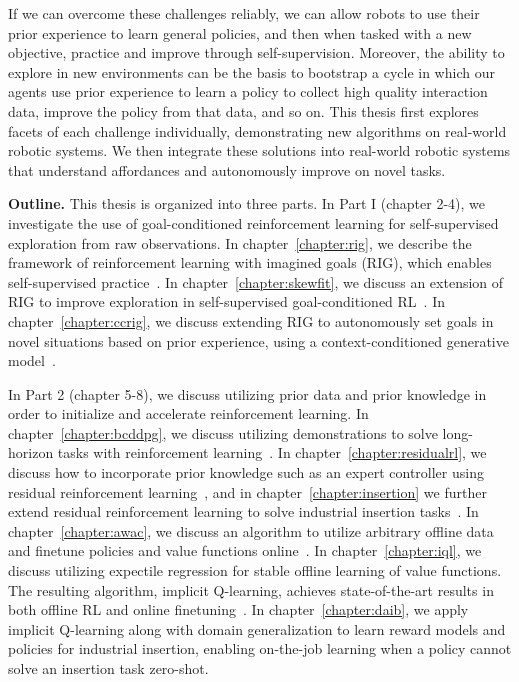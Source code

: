 If we can overcome these challenges reliably, we can allow robots to use their prior experience to learn general policies, and then when tasked with a new objective, practice and improve through self-supervision.
Moreover, the ability to explore in new environments can be the basis to bootstrap a cycle in which our agents use prior experience to learn a policy to collect high quality interaction data, improve the policy from that data, and so on.
This thesis first explores facets of each challenge individually, demonstrating new algorithms on real-world robotic systems.
We then integrate these solutions into real-world robotic systems that understand affordances and autonomously improve on novel tasks.

\vspace{5mm}

\textbf{Outline.} This thesis is organized into three parts. In Part I (chapter 2-4), we investigate the use of goal-conditioned reinforcement learning for self-supervised exploration from raw observations. In chapter~\ref{chapter:rig}, we describe the framework of reinforcement learning with imagined goals (RIG), which enables self-supervised practice~\citep{nair2018rig}. In chapter~\ref{chapter:skewfit}, we discuss an extension of RIG to improve exploration in self-supervised goal-conditioned RL~\citep{pong2019skewfit}. In chapter~\ref{chapter:ccrig}, we discuss extending RIG to autonomously set goals in novel situations based on prior experience, using a context-conditioned generative model~\citep{nair2019ccrig}.

In Part 2 (chapter 5-8), we discuss utilizing prior data and prior knowledge in order to initialize and accelerate reinforcement learning. In chapter~\ref{chapter:bcddpg}, we discuss utilizing demonstrations to solve long-horizon tasks with reinforcement learning~\citep{nair2018demonstrations}. In chapter~\ref{chapter:residualrl}, we discuss how to incorporate prior knowledge such as an expert controller using residual reinforcement learning~\citep{johannink18residualrl}, and in chapter~\ref{chapter:insertion} we further extend residual reinforcement learning to solve industrial insertion tasks~\citep{schoettler2019insertion}. In chapter~\ref{chapter:awac}, we discuss an algorithm to utilize arbitrary offline data and finetune policies and value functions online~\citep{nair2020awac}. In chapter~\ref{chapter:iql}, we discuss utilizing expectile regression for stable offline learning of value functions. The resulting algorithm, implicit Q-learning, achieves state-of-the-art results in both offline RL and online finetuning~\citep{kostrikov2021iql}. In chapter~\ref{chapter:daib}, we apply implicit Q-learning along with domain generalization to learn reward models and policies for industrial insertion, enabling on-the-job learning when a policy cannot solve an insertion task zero-shot. 


